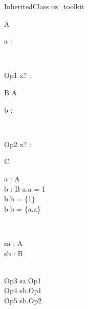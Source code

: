 \begin{zsection}
  \SECTION InheritedClass \parents oz\_toolkit
\end{zsection}

\begin{class}{A}
  \begin{state}
    a : \nat
  \end{state}\\
  \begin{op}{Op1}
    x? : \nat
  \end{op}
\end{class}

\begin{class}{B}
  \inherits A\\
  \begin{state}
    b : \power \nat
  \end{state}\\
  \begin{op}{Op2}
    x? : \power \nat
  \end{op}
\end{class}

\begin{class}{C}
  \begin{axdef}
    a : \poly A\\
    b : B
  \where
    a.a = 1\\
    b.b = \{1\}\\
    b.b = \{a.a\}
  \end{axdef}\\
  \begin{state}
    sa : \poly A\\
    sb : B
  \end{state}\\
  Op3 \sdef sa.Op1\\
  Op4 \sdef sb.Op1\\
  Op5 \sdef sb.Op2
\end{class}
